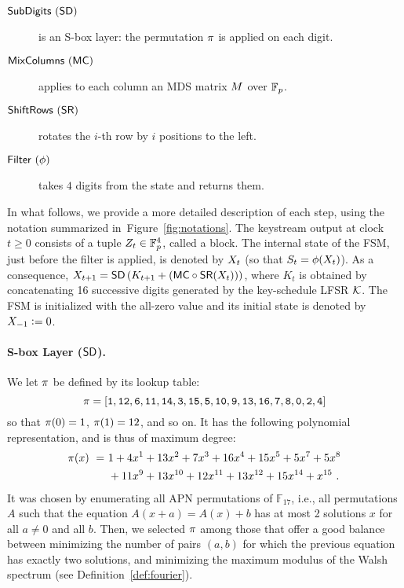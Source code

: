 \begin{description}
\item[$\text{\textsf{SubDigits}}~(\text{\textsf{SD}})$] is an S-box layer: the permutation $\pi$ is applied on each digit.
\item[$\text{\textsf{MixColumns}}~(\text{\textsf{MC}})$] applies to each column an MDS matrix $M$ over \(\mathbb{F}_p\).
\item[$\text{\textsf{ShiftRows}}~(\text{\textsf{SR}})$] rotates the $i$-th row by $i$ positions to the left.
\item[$\text{\textsf{Filter}}~(\mathbf{\phi})$] takes $4$ digits from the state and returns them. 
\end{description}

In what follows, we provide a more detailed description of each step, using the notation summarized in~Figure~\ref{fig:notations}. The keystream output at clock $t \geq 0$ consists of a tuple $Z_t \in \mathbb{F}_{p}^4$, called a block. The internal state of the FSM, just before the filter is applied, is denoted by $X_{t}$ (so that $S_t = \phi(X_{t})$). As a consequence, $X_{t+1} = \text{\textsf{SD}}\left(K_{t+1} + \left(\text{\textsf{MC}} \circ \text{\textsf{SR}} (X_{t})\right)\right)$, where $K_t$ is obtained by concatenating 16 successive digits generated by the key-schedule LFSR $\mathcal{K}$. The FSM is initialized with the all-zero value and its initial state is denoted by $X_{-1} \vcentcolon= 0$.







\paragraph{S-box Layer ($\text{\textsf{SD}}$).}
We let $\pi$ be defined by its lookup table:
\begin{equation}
  \label{eq:thesbox}
  \pi = {\tt [1, 12, 6, 11, 14, 3, 15, 5, 10, 9, 13, 16, 7, 8, 0, 2, 4]}
\end{equation}
so that $\pi(0) = 1$, $\pi(1) = 12$, and so on. It has the following polynomial representation, and is thus of maximum degree: %
\begin{equation*}
  \begin{split}
    \pi(x) ~=~& 1 + 4 x^{1} + 13 x^{2} + 7 x^{3} + 16 x^{4} + 15 x^{5} + 5 x^{7} + 5 x^{8} \\
    & + 11 x^{9} + 13 x^{10} + 12 x^{11} + 13 x^{12} + 15 x^{14} + x^{15}~.
  \end{split}
\end{equation*}
It was chosen by enumerating all APN permutations of $\mathbb{F}_{17}$, i.e., all permutations $A$ such that the equation $A(x+a)=A(x)+b$ has at most 2 solutions $x$ for all $a \neq 0$ and all $b$. Then, we selected $\pi$ among those that offer a good balance between minimizing the number of pairs $(a,b)$ for which the previous equation has exactly two solutions, and minimizing the maximum modulus of the Walsh spectrum (see Definition~\ref{def:fourier}).


